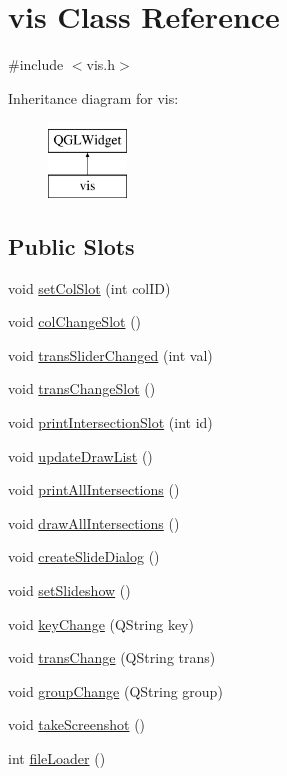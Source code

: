\hypertarget{classvis}{}\section{vis Class Reference}
\label{classvis}


{\ttfamily \#include $<$vis.\+h$>$}

Inheritance diagram for vis\+:\begin{figure}[H]
\begin{center}
\leavevmode
\includegraphics[height=2.000000cm]{classvis}
\end{center}
\end{figure}
\subsection*{Public Slots}
\begin{DoxyCompactItemize}
\item 
void \mbox{\hyperlink{classvis_a2338a54dfa9091ea6b050b814dc2b679}{set\+Col\+Slot}} (int col\+ID)
\item 
void \mbox{\hyperlink{classvis_ad217326086a9f0cfc1e35df9c7ccf9c0}{col\+Change\+Slot}} ()
\item 
void \mbox{\hyperlink{classvis_aa7568cc4804a9f945f54a4933ced67d0}{trans\+Slider\+Changed}} (int val)
\item 
void \mbox{\hyperlink{classvis_af2c43f4aaebe6ee5047e8eb9e9e8eedd}{trans\+Change\+Slot}} ()
\item 
void \mbox{\hyperlink{classvis_a192e67455047ca991fb29fbd4074c11d}{print\+Intersection\+Slot}} (int id)
\item 
void \mbox{\hyperlink{classvis_afd17774826a24e88c4f2eae14d85c7b4}{update\+Draw\+List}} ()
\item 
void \mbox{\hyperlink{classvis_af09e2926e8e8dfa0eca3d6b2f3946fdd}{print\+All\+Intersections}} ()
\item 
void \mbox{\hyperlink{classvis_aca0a94b8f2256122fc6e004a4d7de6e6}{draw\+All\+Intersections}} ()
\item 
void \mbox{\hyperlink{classvis_a09be90ab62dec1dcf2a72690d254acfb}{create\+Slide\+Dialog}} ()
\item 
void \mbox{\hyperlink{classvis_ae8441d597e876882029ee13b16aa4cc2}{set\+Slideshow}} ()
\item 
void \mbox{\hyperlink{classvis_aac05bc47936f37805e95dc251fd70035}{key\+Change}} (Q\+String key)
\item 
void \mbox{\hyperlink{classvis_a01552b5b750d2c56980b62dc1bc3dac9}{trans\+Change}} (Q\+String trans)
\item 
void \mbox{\hyperlink{classvis_aacae1519b8fc0799f9d3676bd35ab957}{group\+Change}} (Q\+String group)
\item 
void \mbox{\hyperlink{classvis_aa44c7eaf89bd4bc5dbcd75d4e2458ec7}{take\+Screenshot}} ()
\item 
int \mbox{\hyperlink{classvis_a2886cfbc9070b5622347b1c6c87dfe18}{file\+Loader}} ()
\end{DoxyCompactItemize}
